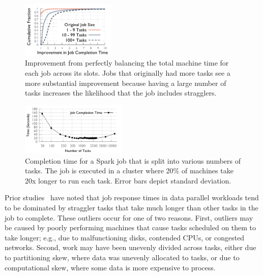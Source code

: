 \begin{figure}[t]
  \centering
    \includegraphics[width=0.4\textwidth]{figures/binpacked1-sep}
    \vspace{-3ex}
    \caption{ Improvement from perfectly balancing the total machine time for
    each job across its slots. Jobs that originally had more tasks see
    a more substantial improvement because having a large number of tasks increases the
    likelihood that the job includes stragglers.}
    \label{fig:binpacked}
\end{figure}

\begin{figure}[t]
\centering
    \includegraphics[width=0.45\textwidth]{figures/spark_experiment/straggler}
    \vspace{-3ex}
    \caption{Completion time for a Spark job that is split into various numbers of tasks. The job is executed in a cluster where 20\% of machines
take 20x longer to run each task. Error bars depict standard deviation.}
    \label{fig:sparkskew}
\end{figure}
Prior studies~\cite{ananthanarayanan2010reining,zaharia2008improving} have
noted that job response times in data parallel workloads tend to be
dominated by straggler tasks that take much longer than other tasks in the
job to complete.
These outliers occur for one of two reasons.
First, outliers may be caused by poorly performing machines that cause tasks scheduled
on them to take longer; e.g.,
due to malfunctioning disks, contended CPUs, or congested networks.
Second, work may have been unevenly
divided across tasks, either due to
partitioning skew, where data was unevenly allocated to tasks, or due to
computational skew, where some data is more expensive to process.

